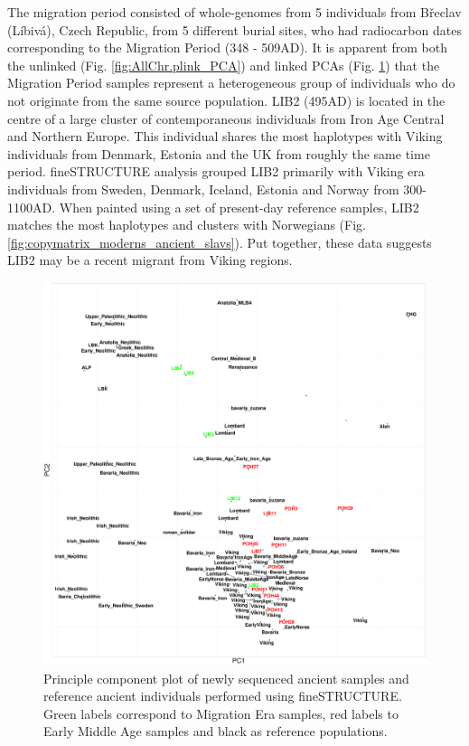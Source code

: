 The migration period consisted of whole-genomes from 5 individuals from Břeclav (Líbivá), Czech Republic, from 5 different burial sites, who had radiocarbon dates corresponding to the Migration Period (348 - 509AD). It is apparent from both the unlinked (Fig. \ref{fig:AllChr.plink_PCA}) and linked PCAs (Fig. \ref{fig:fs_PCA}) that the Migration Period samples represent a heterogeneous group of individuals who do not originate from the same source population. LIB2 (495AD) is located in the centre of a large cluster of contemporaneous individuals from Iron Age Central and Northern Europe. This individual shares the most haplotypes with Viking individuals from Denmark, Estonia and the UK from roughly the same time period. fineSTRUCTURE analysis grouped LIB2 primarily with Viking era individuals from Sweden, Denmark, Iceland, Estonia and Norway from 300-1100AD. When painted using a set of present-day reference samples, LIB2 matches the most haplotypes and clusters with Norwegians (Fig. \ref{fig:copymatrix_moderns_ancient_slavs}). Put together, these data suggests LIB2 may be a recent migrant from Viking regions. 

\begin{figure}[htp]
    \centering
    \includegraphics[width=1.0\textwidth]{../images/chapter5/fs_PCA.pdf}
    \caption{Principle component plot of newly sequenced ancient samples and reference ancient individuals performed using fineSTRUCTURE. Green labels correspond to Migration Era samples, red labels to Early Middle Age samples and black as reference populations.}
    \label{fig:fs_PCA}
\end{figure}

